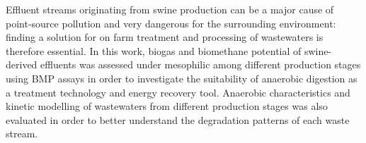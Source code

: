 Effluent streams originating from swine production can be a major cause of point-source pollution and very dangerous for the surrounding environment: finding a solution for on farm treatment and processing of wastewaters is therefore essential. In this work, biogas and biomethane potential of swine-derived effluents was assessed under mesophilic among different production stages using BMP assays in order to investigate the suitability of anaerobic digestion as a treatment technology and energy recovery tool. Anaerobic characteristics and kinetic modelling of wastewaters from different production stages was also evaluated in order to better understand the degradation patterns of each waste stream.